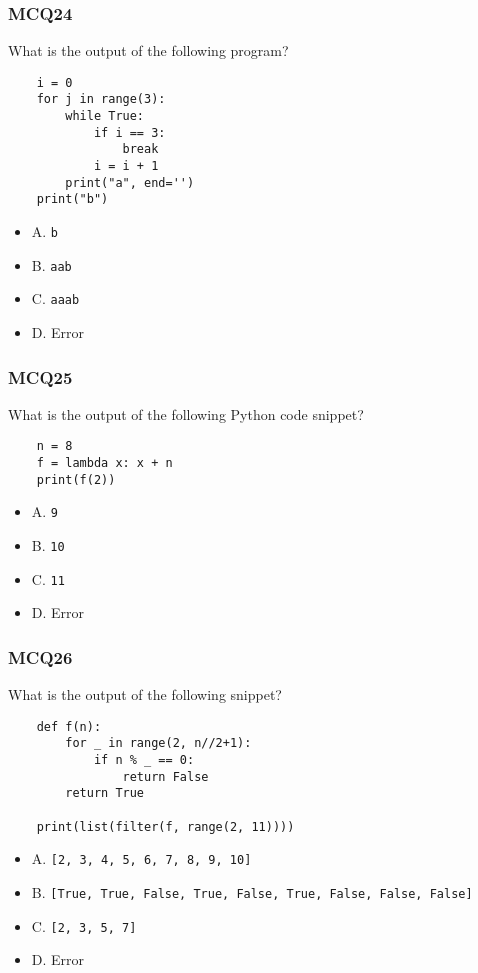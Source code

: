 \documentclass{beamer}
\begin{document}
\begin{frame}[fragile]
    \frametitle{MCQ24}
    What is the output of the following program?
    \begin{verbatim}
    i = 0
    for j in range(3):
        while True:
            if i == 3:
                break
            i = i + 1
        print("a", end='')
    print("b")
    \end{verbatim}
    \begin{itemize}
        \item A. \texttt{b}
        \item B. \texttt{aab}
        \item C. \texttt{aaab}
        \item D. Error
    \end{itemize}
\end{frame}

\begin{frame}[fragile]
    \frametitle{MCQ25}
    What is the output of the following Python code snippet?
    \begin{verbatim}
    n = 8
    f = lambda x: x + n
    print(f(2))
    \end{verbatim}
    \begin{itemize}
        \item A. \texttt{9}
        \item B. \texttt{10}
        \item C. \texttt{11}
        \item D. Error
    \end{itemize}
\end{frame}

\begin{frame}[fragile]
    \frametitle{MCQ26}
    What is the output of the following snippet?
    \begin{verbatim}
    def f(n):
        for _ in range(2, n//2+1):
            if n % _ == 0:
                return False
        return True

    print(list(filter(f, range(2, 11))))
    \end{verbatim}
    \begin{itemize}
        \item A. \texttt{[2, 3, 4, 5, 6, 7, 8, 9, 10]}
        \item B. \texttt{[True, True, False, True, False, True, False, False, False]}
        \item C. \texttt{[2, 3, 5, 7]}
        \item D. Error
    \end{itemize}
\end{frame}
\end{document}
